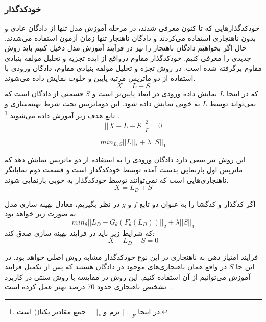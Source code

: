 \documentclass[12pt,a4paper]{report}
\begin{document}
\subsubsection{خودکدگذار }
خودکدگذار‌هایی که تا کنون معرفی شدند، در مرحله آموزش مدل تنها از دادگان عادی و بدون ناهنجاری استفاده می‌کردند و دادگان ناهنجار تنها زمان آزمون استفاده می‌شدند. حال اگر بخواهیم دادگان ناهنجار را نیز در فرآیند آموزش مدل دخیل کنیم باید روش جدیدی را معرفی کنیم. خودکدگذار مقاوم درواقع از ایده تجزیه و تحلیل مؤلفه بنیادی مقاوم برگرفته شده است. در روش تجزه و تحلیل مؤلفه  بنیادی مقاوم، دادگان ورودی با استفاده از دو ماتریس مرتبه پایین و خلوت نمایش داده می‌شوند.
\begin{equation}
	X = L + S
\end{equation}
که در اینجا $L$ نمایش داده ورودی در ابعاد پایین‌تر است و $S$ قسمتی از دادگان است که نمی‌تواند توسط $L$ به خوبی نمایش داده شود. این دوماتریس تحت شرط بهینه‌سازی و تابع هدف زیر آموزش داده می‌شوند
\footnote{
در اینجا
 $||.||_F$ 
نرم  و 
$||.||_*$
 جمع مقادیر یکتا() است.
}
.
\begin{equation}
	||X-L-S||_F^2 = 0
\end{equation}

\begin{equation}
	min_{L,S} ||L||_* + \lambda||S||_1
\end{equation}

این روش نیز سعی دارد دادگان ورودی را به استفاده از دو ماتریس نمایش دهد که ماتریس اول بازنمایی بدست آمده توسط خودکدگذار است و قسمت دوم نمایانگر ناهنجاری‌هایی است که نمی‌توانند توسط خودکدگذار به خوبی بازنمایی شوند.
\begin{equation}
X = L_D + S
\end{equation}

اگر کدگذار و کدگشا را به عنوان دو تابع $f$ و $g$ در نظر بگیریم، معادل بهینه سازی مدل به صورت زیر خواهد بود.
\begin{equation}
	min_{\theta} || L_D - G_\theta(F_\theta(L_D)) ||_2 + \lambda ||S||_1
\end{equation}
که شرایط زیر باید در فرایند بهینه سازی صدق کند:
\begin{equation}
X-L_D-S=0
\end{equation}

فرایند امتیاز دهی به ناهنجاری در این نوع خودکدگذار مشابه روش اصلی خواهد بود. در این جا $S$ در واقع همان ناهنجاری‌های موجود در دادگان هستند که پس از تکمیل فرایند آموزش می‌توانیم از آن استفاده کنیم. این روش در مقایسه با روش سنتی در کاربرد تشخیص ناهنجاری حدود 70 درصد بهتر عمل کرده است~\cite{10.1145/3097983.3098052}.\\
\end{document}
